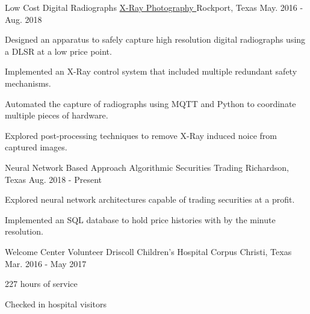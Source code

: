 

\begin{cventries}
  \cventry
    {Low Cost Digital Radiographs} %
		{
			\href{https://github.com/TidalPaladin/xray-controller.git}
			{X-Ray Photography \faGithubSquare}
		} %
    {Rockport, Texas} %
    {May. 2016 - Aug. 2018} %
	{
	\begin{cvitems}
		\item {
			Designed an apparatus to safely capture high resolution
			digital radiographs using a DLSR at
			a low price point.
		}
		\item {
			Implemented an X-Ray control system that included multiple
			redundant safety mechanisms.
		}
		\item {
			Automated the capture of radiographs using MQTT and Python
			to coordinate multiple pieces of hardware.
		}
		\item {
			Explored post-processing techniques to remove X-Ray induced
			noice from captured images.
		}
	\end{cvitems}
	}

  \cventry
  	{Neural Network Based Approach} %
    {Algorithmic Securities Trading} %
    {Richardson, Texas} %
    {Aug. 2018 - Present} %
	{
	\begin{cvitems}
		\item {
			Explored neural network architectures capable of trading
			securities at a profit.
		}
		\item {
			Implemented an SQL database to hold price histories with
			by the minute resolution.
		}
	\end{cvitems}
	}

  \cventry
  	{Welcome Center Volunteer} %
    {Driscoll Children's Hospital} %
    {Corpus Christi, Texas} %
    {Mar. 2016 - May 2017} %
	{
	\begin{cvitems} %
		\item {
			227 hours of service
		}
		\item {
			Checked in hospital visitors
		}
	\end{cvitems}
	}
\end{cventries}
